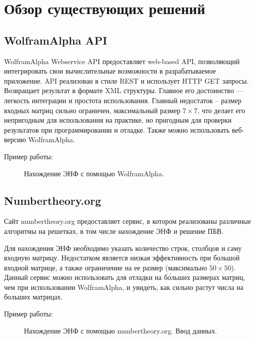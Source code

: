 \newpage

\section{Обзор существующих решений}

\subsection{WolframAlpha API}

WolframAlpha Webservice API предоставляет web-based API, позволяющий интегрировать свои вычислительные возможности в разрабатываемое приложение. API реализован в стиле REST и использует HTTP GET запросы. Возвращает результат в формате XML структуры. Главное его достоинство --- легкость интеграции и простота использования. Главный недостаток -- размер входных матриц сильно ограничен, максимальный размер $ 7 \times 7 $, что делает его непригодным для использования на практике, но пригодным для проверки результатов при программировании и отладке. Также можно использовать веб-версию WolframAlpha.

Пример работы:

\begin{figure}[H]
\caption{Нахождение ЭНФ с помощью WolframAlpha.}
\label{fig:HNF_WA}
\end{figure}

\subsection{Numbertheory.org}

Сайт numbertheory.org предоставляет сервис, в котором реализованы различные алгоритмы на решетках, в том числе нахождение ЭНФ и решение ПБВ. 

Для нахождения ЭНФ необходимо указать количество строк, столбцов и саму входную матрицу. Недостатком является низкая эффективность при большой входной матрице, а также ограничение на ее размер (максимально $ 50 \times 50 $). Данный сервис можно использовать для отладки на б\'ольших размерах матриц, чем при использовании WolframAlpha, и увидеть, как сильно растут числа на больших матрицах.

Пример работы:

\begin{figure}[H]
\caption{Нахождение ЭНФ с помощью numbertheory.org. Ввод данных.}
\label{fig:HNF_NT_INPUT}
\end{figure}

